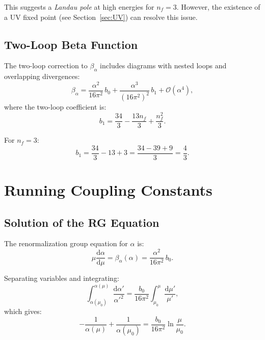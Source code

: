 \documentclass[11pt,a4paper]{article}
\numberwithin{equation}{section}
\theoremstyle{plain}
\theoremstyle{definition}
\theoremstyle{remark}
\newcommand{\dd}{\mathrm{d}}
\begin{document}
This suggests a \emph{Landau pole} at high energies for $n_f=3$. However, the existence of a UV fixed point (see Section~\ref{sec:UV}) can resolve this issue.

\subsection{Two-Loop Beta Function}

The two-loop correction to $\beta_\alpha$ includes diagrams with nested loops and overlapping divergences:
\begin{equation}
\beta_\alpha = \frac{\alpha^2}{16\pi^2}\,b_0 + \frac{\alpha^3}{(16\pi^2)^2}\,b_1 + \mathcal{O}(\alpha^4),
\label{eq:beta-alpha-2loop}
\end{equation}
where the two-loop coefficient is:
\begin{equation}
b_1 = \frac{34}{3} - \frac{13n_f}{3} + \frac{n_f^2}{3}.
\label{eq:b1}
\end{equation}

For $n_f=3$:
\begin{equation}
b_1 = \frac{34}{3} - 13 + 3 = \frac{34-39+9}{3} = \frac{4}{3}.
\label{eq:b1-nf3}
\end{equation}

\vspace{1em}

\section{Running Coupling Constants}\label{sec:running}

\subsection{Solution of the RG Equation}

The renormalization group equation for $\alpha$ is:
\begin{equation}
\mu\frac{\dd\alpha}{\dd\mu} = \beta_\alpha(\alpha) = \frac{\alpha^2}{16\pi^2}\,b_0.
\label{eq:RG-alpha}
\end{equation}

Separating variables and integrating:
\begin{equation}
\int_{\alpha(\mu_0)}^{\alpha(\mu)} \frac{\dd\alpha'}{\alpha'^2} = \frac{b_0}{16\pi^2}\int_{\mu_0}^\mu \frac{\dd\mu'}{\mu'},
\label{eq:RG-integral}
\end{equation}
which gives:
\begin{equation}
-\frac{1}{\alpha(\mu)} + \frac{1}{\alpha(\mu_0)} = \frac{b_0}{16\pi^2}\ln\frac{\mu}{\mu_0}.
\label{eq:RG-solved}
\end{equation}
\end{document}
